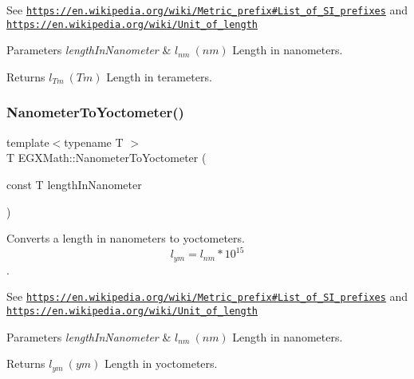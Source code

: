 See \href{https://en.wikipedia.org/wiki/Metric_prefix#List_of_SI_prefixes}{\tt https\+://en.\+wikipedia.\+org/wiki/\+Metric\+\_\+prefix\#\+List\+\_\+of\+\_\+\+S\+I\+\_\+prefixes} and \href{https://en.wikipedia.org/wiki/Unit_of_length}{\tt https\+://en.\+wikipedia.\+org/wiki/\+Unit\+\_\+of\+\_\+length} 
\begin{DoxyParams}{Parameters}
{\em length\+In\+Nanometer} & $ l_{nm}\ (nm)$ Length in nanometers. \\
\hline
\end{DoxyParams}
\begin{DoxyReturn}{Returns}
$ l_{Tm}\ (Tm)$ Length in terameters. 
\end{DoxyReturn}
\mbox{\label{group___e_g_x_math-_conversions-_length_conversions-_s_i-_nanometer-_s_i_gab447c3aa3d215a1030a63e28f9aca1c1}} 
\subsubsection{\texorpdfstring{Nanometer\+To\+Yoctometer()}{NanometerToYoctometer()}}
{\footnotesize\ttfamily template$<$typename T $>$ \\
T E\+G\+X\+Math\+::\+Nanometer\+To\+Yoctometer (\begin{DoxyParamCaption}\item[{const T}]{length\+In\+Nanometer }\end{DoxyParamCaption})}



Converts a length in nanometers to yoctometers. \[ l_{ym}=l_{nm} * 10^{15} \]. 

See \href{https://en.wikipedia.org/wiki/Metric_prefix#List_of_SI_prefixes}{\tt https\+://en.\+wikipedia.\+org/wiki/\+Metric\+\_\+prefix\#\+List\+\_\+of\+\_\+\+S\+I\+\_\+prefixes} and \href{https://en.wikipedia.org/wiki/Unit_of_length}{\tt https\+://en.\+wikipedia.\+org/wiki/\+Unit\+\_\+of\+\_\+length} 
\begin{DoxyParams}{Parameters}
{\em length\+In\+Nanometer} & $ l_{nm}\ (nm)$ Length in nanometers. \\
\hline
\end{DoxyParams}
\begin{DoxyReturn}{Returns}
$ l_{ym}\ (ym)$ Length in yoctometers. 
\end{DoxyReturn}
\mbox{\label{group___e_g_x_math-_conversions-_length_conversions-_s_i-_nanometer-_s_i_ga986e80d7ab490fdc59ebbc2d7473bda3}} 
